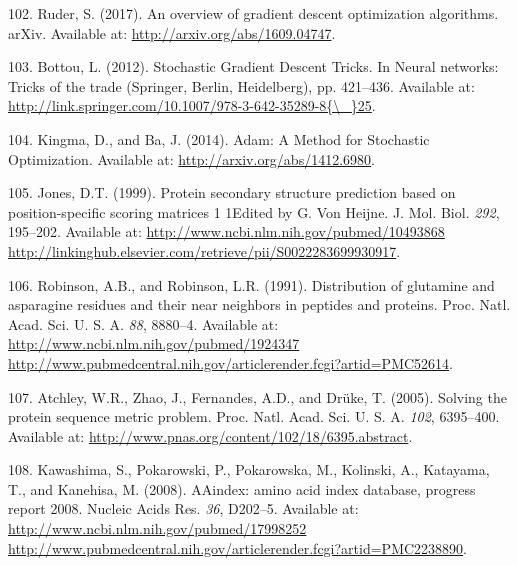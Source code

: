 \documentclass[12pt,a4paper,twoside]{book}
\theoremstyle{definition}
\theoremstyle{definition}
\theoremstyle{remark}
\begin{document}
\hypertarget{ref-Ruder2017}{}
102. Ruder, S. (2017). An overview of gradient descent optimization
algorithms. arXiv. Available at: \url{http://arxiv.org/abs/1609.04747}.

\hypertarget{ref-Bottou2012}{}
103. Bottou, L. (2012). Stochastic Gradient Descent Tricks. In Neural
networks: Tricks of the trade (Springer, Berlin, Heidelberg), pp.
421--436. Available at:
\href{http://link.springer.com/10.1007/978-3-642-35289-8\%7B/_\%7D25}{http://link.springer.com/10.1007/978-3-642-35289-8\{\textbackslash{}\_\}25}.

\hypertarget{ref-Kingma2014}{}
104. Kingma, D., and Ba, J. (2014). Adam: A Method for Stochastic
Optimization. Available at: \url{http://arxiv.org/abs/1412.6980}.

\hypertarget{ref-Jones1999}{}
105. Jones, D.T. (1999). Protein secondary structure prediction based on
position-specific scoring matrices 1 1Edited by G. Von Heijne. J. Mol.
Biol. \emph{292}, 195--202. Available at:
\href{http://www.ncbi.nlm.nih.gov/pubmed/10493868\%20http://linkinghub.elsevier.com/retrieve/pii/S0022283699930917}{http://www.ncbi.nlm.nih.gov/pubmed/10493868 http://linkinghub.elsevier.com/retrieve/pii/S0022283699930917}.

\hypertarget{ref-Robinson1991}{}
106. Robinson, A.B., and Robinson, L.R. (1991). Distribution of
glutamine and asparagine residues and their near neighbors in peptides
and proteins. Proc. Natl. Acad. Sci. U. S. A. \emph{88}, 8880--4.
Available at:
\href{http://www.ncbi.nlm.nih.gov/pubmed/1924347\%20http://www.pubmedcentral.nih.gov/articlerender.fcgi?artid=PMC52614}{http://www.ncbi.nlm.nih.gov/pubmed/1924347 http://www.pubmedcentral.nih.gov/articlerender.fcgi?artid=PMC52614}.

\hypertarget{ref-Atchley2005}{}
107. Atchley, W.R., Zhao, J., Fernandes, A.D., and Drüke, T. (2005).
Solving the protein sequence metric problem. Proc. Natl. Acad. Sci. U.
S. A. \emph{102}, 6395--400. Available at:
\url{http://www.pnas.org/content/102/18/6395.abstract}.

\hypertarget{ref-Kawashima2008}{}
108. Kawashima, S., Pokarowski, P., Pokarowska, M., Kolinski, A.,
Katayama, T., and Kanehisa, M. (2008). AAindex: amino acid index
database, progress report 2008. Nucleic Acids Res. \emph{36}, D202--5.
Available at:
\href{http://www.ncbi.nlm.nih.gov/pubmed/17998252\%20http://www.pubmedcentral.nih.gov/articlerender.fcgi?artid=PMC2238890}{http://www.ncbi.nlm.nih.gov/pubmed/17998252 http://www.pubmedcentral.nih.gov/articlerender.fcgi?artid=PMC2238890}.
\end{document}
